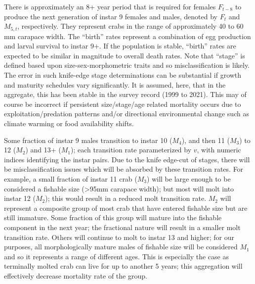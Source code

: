 \documentclass[
	letterpaper, %
	10pt, %
]{article}
\begin{document}
There is approximately an 8+ year period that is required for females
$F_{t-8}$ to produce the next generation of instar 9 females and males, denoted
by $F_{t}$ and $M_{5,t}$, respectively. They represent crabs in the range of approximately
40 to 60 mm carapace width. The ``birth'' rates represent a combination of egg
production and larval survival to instar 9+. If the population is
stable, ``birth'' rates are expected to be similar in magnitude
to overall death rates. Note that ``stage'' is defined based upon
size-sex-morphometric traits and so misclassification is likely. The
error in such knife-edge stage determinations can be substantial if
growth and maturity schedules vary significantly. It is assumed, here,
that in the aggregate, this has been stable in the survey record (1999
to 2021). This may of course be incorrect if persistent size/stage/age
related mortality occurs due to exploitation/predation patterns and/or
directional environmental change such as climate warming or food availability
shifts.

Some fraction of instar 9 males transition to instar 10 ($M_{4}$), and then 11 ($M_{3}$) to 12 ($M_{2}$) and 13+ ($M_{1}$); each transition rate parameterized by 
$v$, with numeric indices identifying the instar pairs. Due to the knife
edge-cut of stages, there will be misclassification issues which will
be absorbed by these transition rates. For example, a small fraction
of instar 11 crab ($M_{3}$) will be large enough to be considered a fishable size (\textgreater95mm carapace width); but most will molt into instar 12 ($M_{2}$); this would result in a reduced molt transition rate. 
$M_{2}$ will represent a composite group of most crab that have entered fishable
size but are still immature. Some fraction of this group will mature
into the fishable component in the next year; the fractional nature
will result in a smaller molt transition rate. Others will continue
to molt to instar 13 and higher; for our purposes, all morphologically
mature males of fishable size will be considered 
$M_{1}$ and so it represents a range of different ages. This is especially
the case as terminally molted crab can live for up to another 5 years;
this aggregation will effectively decrease mortality rate of the group.
\end{document}
